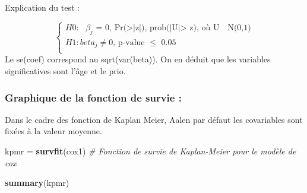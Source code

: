 \documentclass[
]{article}
\newenvironment{Shaded}{\begin{snugshade}}{\end{snugshade}}
\newcommand{\CommentTok}[1]{\textcolor[rgb]{0.56,0.35,0.01}{\textit{#1}}}
\newcommand{\FunctionTok}[1]{\textcolor[rgb]{0.13,0.29,0.53}{\textbf{#1}}}
\newcommand{\NormalTok}[1]{#1}
\newcommand{\OtherTok}[1]{\textcolor[rgb]{0.56,0.35,0.01}{#1}}
\begin{document}
Explication du test :

\[
\left\{
\begin{array}{l}
H0 : \text{ $\beta_j$ = 0,  Pr(>|z|), prob(|U|> z), où U ~ N(0,1)} \\
H1 : \text{$beta_j \neq 0$, p-value $\leq$ 0.05} \\
\end{array}
\right.
\] Le se(coef) correspond au sqrt(var(beta)). On en déduit que les
variables significatives sont l'âge et le prio.

\hypertarget{graphique-de-la-fonction-de-survie}{%
\subsubsection{Graphique de la fonction de survie
:}\label{graphique-de-la-fonction-de-survie}}

Dans le cadre des fonction de Kaplan Meier, Aalen par défaut les
covariables sont fixées à la valeur moyenne.

\begin{Shaded}
\begin{Highlighting}[]
\NormalTok{kpmr }\OtherTok{=} \FunctionTok{survfit}\NormalTok{(cox1) }\CommentTok{\# Fonction de survie de Kaplan{-}Meier pour le modèle de cox}

\FunctionTok{summary}\NormalTok{(kpmr)}
\end{Highlighting}
\end{Shaded}
\end{document}
